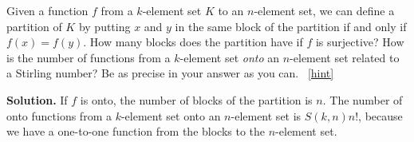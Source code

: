 \documentclass{book}
\begin{document}
\setcounter{project}{203}
\addtocounter{project}{-1}
\begin{activity}[]\label{activity-196}
\hypertarget{p-1164}{}%
Given a function \(f\) from a \(k\)-element set \(K\) to an \(n\)-element set, we can define a partition of \(K\) by putting \(x\) and \(y\) in the same block of the partition if and only if \(f(x)=f(y)\). How many blocks does the partition have if \(f\) is surjective? How is the number of functions from a \(k\)-element set \emph{onto} an \(n\)-element set related to a Stirling number? Be as precise in your answer as you can.%
~\hfill{\tiny\hyperlink{a-203}{[hint]}\hypertarget{q-203}{}}\par\smallskip%
\noindent\textbf{Solution.}\hypertarget{solution-127}{}\quad%
\hypertarget{p-1166}{}%
If \(f\) is onto, the number of blocks of the partition is \(n\). The number of onto functions from a \(k\)-element set onto an \(n\)-element set is \(S(k,n)n!\), because we have a one-to-one function from the blocks to the \(n\)-element set.%
\end{activity}
\end{document}
